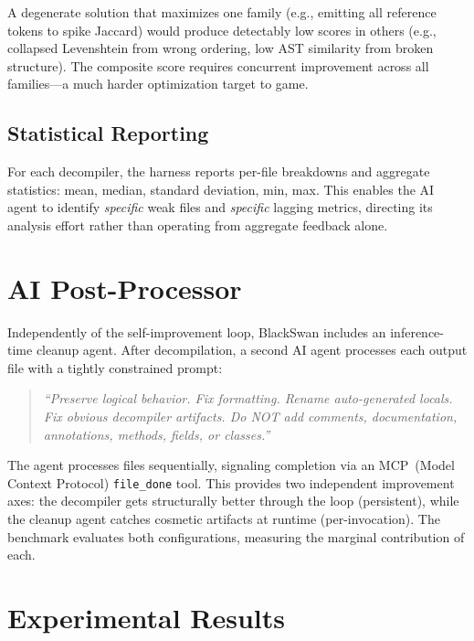 \documentclass[conference,11pt]{IEEEtran}
\begin{document}
A degenerate solution that maximizes one family (e.g., emitting all reference tokens to spike Jaccard) would produce detectably low scores in others (e.g., collapsed Levenshtein from wrong ordering, low AST similarity from broken structure). The composite score requires concurrent improvement across all families---a much harder optimization target to game.

\subsection{Statistical Reporting}

For each decompiler, the harness reports per-file breakdowns and aggregate statistics: mean, median, standard deviation, min, max. This enables the AI agent to identify \emph{specific} weak files and \emph{specific} lagging metrics, directing its analysis effort rather than operating from aggregate feedback alone.

\section{AI Post-Processor}
\label{sec:postprocessor}

Independently of the self-improvement loop, BlackSwan includes an inference-time cleanup agent. After decompilation, a second AI agent processes each output file with a tightly constrained prompt:

\begin{quote}
\emph{``Preserve logical behavior. Fix formatting. Rename auto-generated locals. Fix obvious decompiler artifacts. Do NOT add comments, documentation, annotations, methods, fields, or classes.''}
\end{quote}

The agent processes files sequentially, signaling completion via an MCP~(Model Context Protocol) \texttt{file\_done} tool. This provides two independent improvement axes: the decompiler gets structurally better through the loop (persistent), while the cleanup agent catches cosmetic artifacts at runtime (per-invocation). The benchmark evaluates both configurations, measuring the marginal contribution of each.

\section{Experimental Results}
\label{sec:results}
\end{document}
